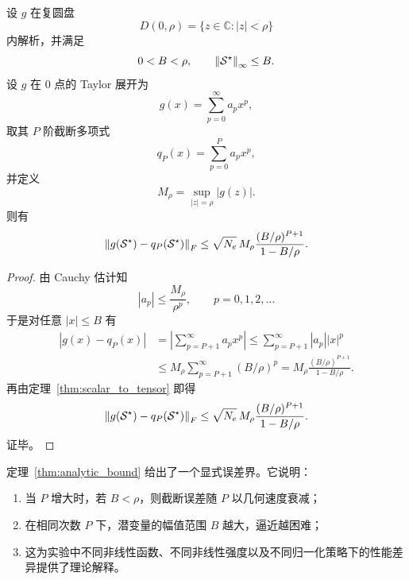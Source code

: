 \begin{theorem}[解析链接函数下的显式截断界]
\label{thm:analytic_bound}
设 $g$ 在复圆盘
\begin{equation}
D(0,\rho)=\{z\in\mathbb{C}: |z|<\rho\}
\end{equation}
内解析，并满足
\begin{equation}
0<B<\rho,
\qquad
\left\lVert \mathcal{S}^\star \right\rVert_\infty\le B.
\end{equation}
设 $g$ 在 $0$ 点的 Taylor 展开为
\begin{equation}
g(x)=\sum_{p=0}^{\infty} a_p x^p,
\end{equation}
取其 $P$ 阶截断多项式
\begin{equation}
q_P(x)=\sum_{p=0}^{P} a_p x^p,
\end{equation}
并定义
\begin{equation}
M_\rho=\sup_{|z|=\rho}|g(z)|.
\end{equation}
则有
\begin{equation}
\left\lVert 
g(\mathcal{S}^\star)-q_P(\mathcal{S}^\star)
 \right\rVert_F
\le
\sqrt{N_e}\,M_\rho
\frac{(B/\rho)^{P+1}}{1-B/\rho}.
\label{eq:analytic_truncation_bound}
\end{equation}
\end{theorem}

\begin{proof}
由 Cauchy 估计知
\begin{equation}
|a_p|\le \frac{M_\rho}{\rho^p},\qquad p=0,1,2,\dots
\end{equation}
于是对任意 $|x|\le B$ 有
\begin{align}
|g(x)-q_P(x)|
&=
\left|
\sum_{p=P+1}^{\infty} a_p x^p
\right|
\le
\sum_{p=P+1}^{\infty}|a_p||x|^p \\
&\le
M_\rho
\sum_{p=P+1}^{\infty}(B/\rho)^p
=
M_\rho \frac{(B/\rho)^{P+1}}{1-B/\rho}.
\end{align}
再由定理~\ref{thm:scalar_to_tensor} 即得
\begin{equation}
\left\lVert 
g(\mathcal{S}^\star)-q_P(\mathcal{S}^\star)
 \right\rVert_F
\le
\sqrt{N_e}\,M_\rho
\frac{(B/\rho)^{P+1}}{1-B/\rho}.
\end{equation}
证毕。
\end{proof}

\begin{remark}
定理~\ref{thm:analytic_bound} 给出了一个显式误差界。它说明：
\begin{enumerate}
    \item 当 $P$ 增大时，若 $B<\rho$，则截断误差随 $P$ 以几何速度衰减；
    \item 在相同次数 $P$ 下，潜变量的幅值范围 $B$ 越大，逼近越困难；
    \item 这为实验中不同非线性函数、不同非线性强度以及不同归一化策略下的性能差异提供了理论解释。
\end{enumerate}
\end{remark}

